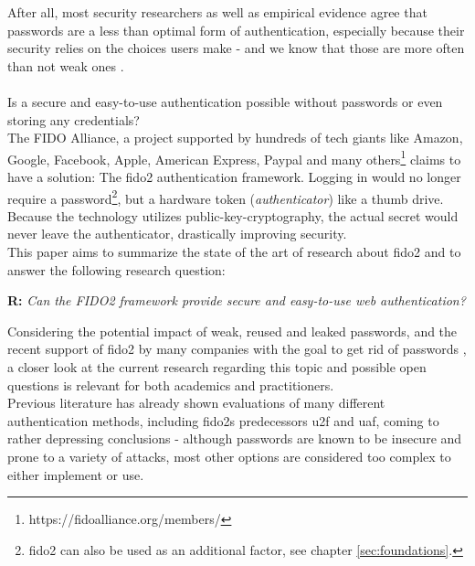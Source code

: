 After all, most security researchers as well as empirical evidence agree that passwords are a less than optimal form of authentication, especially because their security relies on the choices users make - and we know that those are more often than not weak ones \cite{hunt2018c,whitty2015}.\\
\\
Is a secure and easy-to-use authentication possible without passwords or even storing any credentials?\\
The FIDO Alliance, a project supported by hundreds of tech giants like Amazon, Google, Facebook, Apple, American Express, Paypal and many others\footnote{https://fidoalliance.org/members/} claims to have a solution: The \ac{fido2} authentication framework. Logging in would no longer require a password\footnote{\ac{fido2} can also be used as an additional factor, see chapter \ref{sec:foundations}.}, but a hardware token (\emph{authenticator}) like a thumb drive. Because the technology utilizes public-key-cryptography, the actual secret would never leave the authenticator, drastically improving security.\\
This paper aims to summarize the state of the art of research about \ac{fido2} and to answer the following research question:


\begin{displayquote}
    \textbf{R:} \emph{Can the FIDO2 framework provide secure and easy-to-use web authentication?}
\end{displayquote}

\noindent Considering the potential impact of weak, reused and leaked passwords, and the recent support of \ac{fido2} by many companies with the goal to get rid of passwords \cite{ng2019,mingis2020,mehta2018,fido2_overview}, a closer look at the current research regarding this topic and possible open questions is relevant for both academics and practitioners.\\
Previous literature has already shown evaluations of many different authentication methods, including \acp{fido2} predecessors \ac{u2f} and \ac{uaf}, coming to rather depressing conclusions \cite{bonneau2012,hunt2018a,lang2017,das2018} - although passwords are known to be insecure and prone to a variety of attacks, most other options are considered too complex to either implement or use.